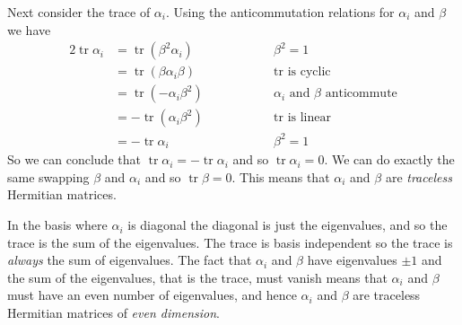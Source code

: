 \documentclass[fleqn]{NotesClass}
\DeclareMathOperator{\tr}{tr}
\begin{document}
    Next consider the trace of \(\alpha_i\).
    Using the anticommutation relations for \(\alpha_i\) and \(\beta\) we have
    \begin{alignat}{2}
        \tr \alpha_i &= \tr(\beta^2 \alpha_i) \qquad\qquad && \beta^2 = 1\\
        &= \tr(\beta \alpha_i \beta) \qquad\qquad && \tr \text{ is cyclic}\\
        &= \tr(-\alpha_i\beta^2) \qquad\qquad && \alpha_i \text{ and } \beta \text{ anticommute}\\
        &= -\tr(\alpha_i\beta^2) \qquad\qquad && \tr \text{ is linear}\\
        &= -\tr \alpha_i \qquad\qquad && \beta^2 = 1
    \end{alignat}
    So we can conclude that \(\tr \alpha_i = -\tr \alpha_i\) and so \(\tr\alpha_i = 0\).
    We can do exactly the same swapping \(\beta\) and \(\alpha_i\) and so \(\tr\beta = 0\).
    This means that \(\alpha_i\) and \(\beta\) are \emph{traceless} Hermitian matrices.
    
    In the basis where \(\alpha_i\) is diagonal the diagonal is just the eigenvalues, and so the trace is the sum of the eigenvalues.
    The trace is basis independent so the trace is \emph{always} the sum of eigenvalues.
    The fact that \(\alpha_i\) and \(\beta\) have eigenvalues \(\pm 1\) and the sum of the eigenvalues, that is the trace, must vanish means that \(\alpha_i\) and \(\beta\) must have an even number of eigenvalues, and hence \(\alpha_i\) and \(\beta\) are traceless Hermitian matrices of \emph{even dimension}.
    
\end{document}
